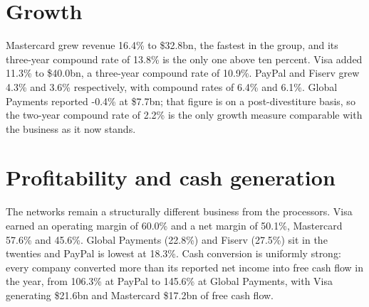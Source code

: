 \documentclass[10pt]{article}
\begin{document}
\section*{Growth}
Mastercard grew revenue 16.4\% to \$32.8bn, the fastest in the group, and its three-year compound rate of 13.8\% is the only one above ten percent. Visa added 11.3\% to \$40.0bn, a three-year compound rate of 10.9\%. PayPal and Fiserv grew 4.3\% and 3.6\% respectively, with compound rates of 6.4\% and 6.1\%. Global Payments reported -0.4\% at \$7.7bn; that figure is on a post-divestiture basis, so the two-year compound rate of 2.2\% is the only growth measure comparable with the business as it now stands.\par
\section*{Profitability and cash generation}
The networks remain a structurally different business from the processors. Visa earned an operating margin of 60.0\% and a net margin of 50.1\%, Mastercard 57.6\% and 45.6\%. Global Payments (22.8\%) and Fiserv (27.5\%) sit in the twenties and PayPal is lowest at 18.3\%. Cash conversion is uniformly strong: every company converted more than its reported net income into free cash flow in the year, from 106.3\% at PayPal to 145.6\% at Global Payments, with Visa generating \$21.6bn and Mastercard \$17.2bn of free cash flow.\par
\end{document}

